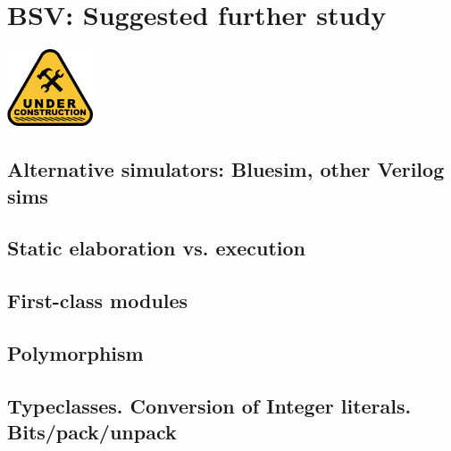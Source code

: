 

\chapter{BSV: Suggested further study}


\setcounter{page}{1}
\renewcommand{\thepage}{\arabic{chapter}-\arabic{page}}

\label{ch_BSV_further_study}


\vspace{2ex}

\centerline{\includegraphics[width=1in,angle=0]{Figures/Fig_Under_Construction}}

\vspace{2ex}

\section{Alternative simulators: Bluesim, other Verilog sims}

\section{Static elaboration vs. execution}

\section{First-class modules}

\section{Polymorphism}

\section{Typeclasses. Conversion of Integer literals. Bits/pack/unpack}

